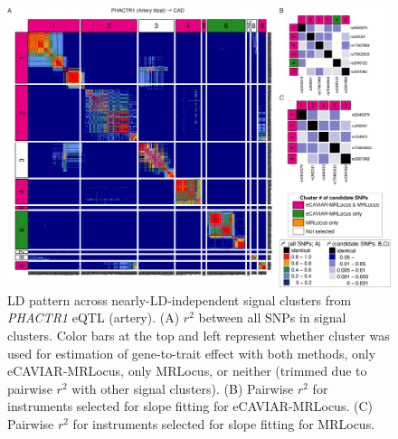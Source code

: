 \documentclass[11pt]{article}
\begin{document}
\begin{figure}[!ht]
  \centering
  \includegraphics[width=\textwidth]{figs/region/heatmap_eQTLbase.Artery_PHACTR1_CAD.20210114.png}
  \caption{LD pattern across nearly-LD-independent signal clusters
    from \emph{PHACTR1} eQTL (artery).
    (A) $r^2$ between all SNPs in signal clusters. Color bars at the
    top and left represent whether cluster was used for estimation of
    gene-to-trait effect with both methods, only eCAVIAR-MRLocus, only
    MRLocus, or neither (trimmed due to pairwise $r^2$ with other
    signal clusters). (B) Pairwise $r^2$ for instruments selected for
    slope fitting for eCAVIAR-MRLocus. (C) Pairwise $r^2$ for
    instruments selected for slope fitting for MRLocus.}
\end{figure}
\end{document}
